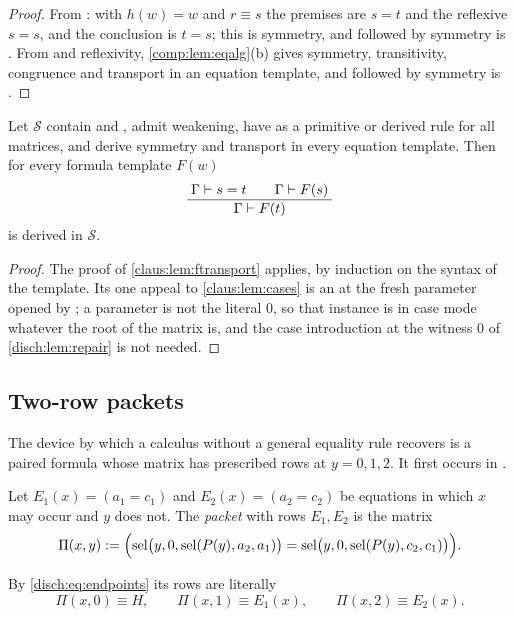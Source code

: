 \begin{proof}
From : with $h(w)=w$ and $r\equiv s$ the premises are $s=t$
and the reflexive $s=s$, and the conclusion is $t=s$; this is symmetry, and
 followed by symmetry is . From 
and reflexivity, \cref{comp:lem:eqalg}(b) gives symmetry, transitivity,
congruence and transport in an equation template, and 
followed by symmetry is .
\end{proof}

\begin{lemma}
\label{disch:lem:formula}
Let $\mathcal S$ contain  and , admit
weakening, have  as a primitive or derived rule for all
matrices, and derive symmetry and transport in every equation template.
Then for every formula template $F(w)$
\[
 \dfrac{\;\Gamma\vdash s=t\qquad\Gamma\vdash F(s)\;}{\;\Gamma\vdash F(t)\;}
\]
is derived in $\mathcal S$.
\end{lemma}

\begin{proof}
The proof of \cref{claus:lem:ftransport} applies, by induction on the
syntax of the template. Its one appeal to \cref{claus:lem:cases} is an
 at the fresh parameter opened by ; a
parameter is not the literal $0$, so that instance is in case mode
whatever the root of the matrix is, and the case introduction at the
witness $0$ of \cref{disch:lem:repair} is not needed.
\end{proof}

\subsection{Two-row packets}

The device by which a calculus without a general equality rule recovers
 is a paired formula whose matrix has prescribed rows at
$y=0,1,2$. It first occurs in .

\begin{definition}[Packet]
\label{disch:def:packet}
Let $E_1(x)=(a_1=c_1)$ and $E_2(x)=(a_2=c_2)$ be equations in which $x$
may occur and $y$ does not. The \emph{packet} with rows $E_1,E_2$ is the
matrix
\[
 \Pi(x,y)\mathrel{:=}\Bigl(\operatorname{sel}\bigl(y,0,\operatorname{sel}(P(y),a_2,a_1)\bigr)
 =\operatorname{sel}\bigl(y,0,\operatorname{sel}(P(y),c_2,c_1)\bigr)\Bigr).
\]
\end{definition}

By \eqref{disch:eq:endpoints} its rows are literally
\begin{equation}
 \Pi(x,0)\equiv H,\qquad \Pi(x,1)\equiv E_1(x),\qquad
 \Pi(x,2)\equiv E_2(x).
 \label{disch:eq:rows}
\end{equation}

